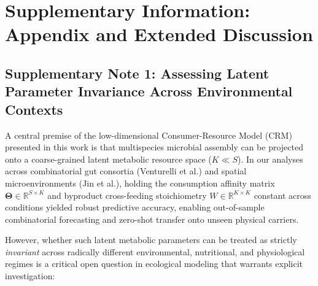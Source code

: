 \clearpage
\onecolumn
\section*{Supplementary Information: Appendix and Extended Discussion}
\label{sec:appendix}

\subsection*{Supplementary Note 1: Assessing Latent Parameter Invariance Across Environmental Contexts}
\label{note:invariance}

A central premise of the low-dimensional Consumer-Resource Model (CRM) presented in this work is that multispecies microbial assembly can be projected onto a coarse-grained latent metabolic resource space ($K \ll S$). In our analyses across combinatorial gut consortia (Venturelli et al.) and spatial microenvironments (Jin et al.), holding the consumption affinity matrix $\mathbf{\Theta} \in \mathbb{R}^{S \times K}$ and byproduct cross-feeding stoichiometry $W \in \mathbb{R}^{K \times K}$ constant across conditions yielded robust predictive accuracy, enabling out-of-sample combinatorial forecasting and zero-shot transfer onto unseen physical carriers. 

However, whether such latent metabolic parameters can be treated as strictly \textit{invariant} across radically different environmental, nutritional, and physiological regimes is a critical open question in ecological modeling that warrants explicit investigation:

